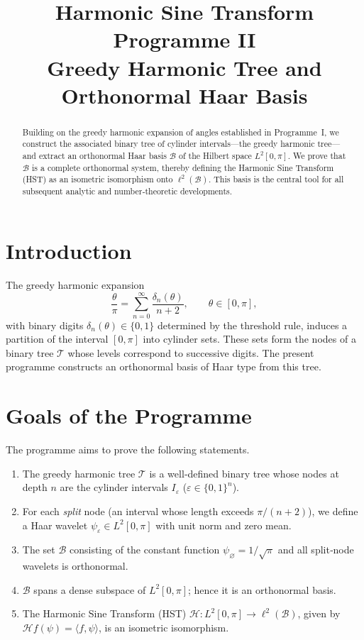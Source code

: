 \documentclass[11pt,a4paper]{article}
\title{\bfseries Harmonic Sine Transform Programme II\\
\large Greedy Harmonic Tree and Orthonormal Haar Basis}
\author{}
\date{}
\begin{document}
\maketitle

\begin{abstract}
Building on the greedy harmonic expansion of angles established in Programme~I, we construct the associated binary tree of cylinder intervals—the greedy harmonic tree—and extract an orthonormal Haar basis \(\mathcal{B}\) of the Hilbert space \(L^2[0,\pi]\).  We prove that \(\mathcal{B}\) is a complete orthonormal system, thereby defining the Harmonic Sine Transform (HST) as an isometric isomorphism onto \(\ell^2(\mathcal{B})\).  This basis is the central tool for all subsequent analytic and number‑theoretic developments.
\end{abstract}

\section{Introduction}
The greedy harmonic expansion
\[
\frac{\theta}{\pi} = \sum_{n=0}^{\infty} \frac{\delta_n(\theta)}{n+2},\qquad \theta\in[0,\pi],
\]
with binary digits \(\delta_n(\theta)\in\{0,1\}\) determined by the threshold rule, induces a partition of the interval \([0,\pi]\) into cylinder sets.  These sets form the nodes of a binary tree \(\mathcal{T}\) whose levels correspond to successive digits.  The present programme constructs an orthonormal basis of Haar type from this tree.

\section{Goals of the Programme}
The programme aims to prove the following statements.
\begin{enumerate}
\item The greedy harmonic tree \(\mathcal{T}\) is a well‑defined binary tree whose nodes at depth \(n\) are the cylinder intervals \(I_\varepsilon\) (\(\varepsilon\in\{0,1\}^n\)).
\item For each \emph{split} node (an interval whose length exceeds \(\pi/(n+2)\)), we define a Haar wavelet \(\psi_\varepsilon\in L^2[0,\pi]\) with unit norm and zero mean.
\item The set \(\mathcal{B}\) consisting of the constant function \(\psi_\varnothing = 1/\sqrt{\pi}\) and all split‑node wavelets is orthonormal.
\item \(\mathcal{B}\) spans a dense subspace of \(L^2[0,\pi]\); hence it is an orthonormal basis.
\item The Harmonic Sine Transform (HST) \(\mathcal{H}:L^2[0,\pi]\to\ell^2(\mathcal{B})\), given by \(\mathcal{H}f(\psi)=\langle f,\psi\rangle\), is an isometric isomorphism.
\end{enumerate}
\end{document}
